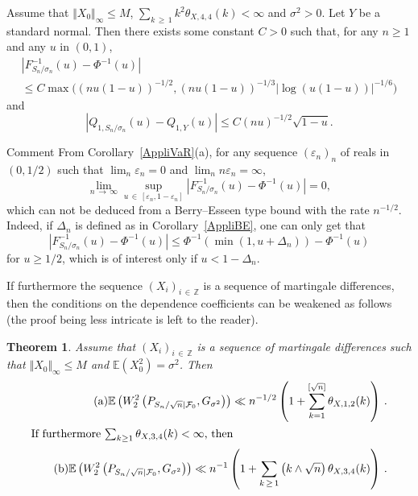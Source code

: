 \documentclass[10pt]{amsart}
\newtheorem{theo}{Theorem}[section]
\theoremstyle{definition}\newtheorem{defi}[theo]{Definition}\newtheorem{rema}[theo]{Remark}\newtheorem{exam}[theo]{Example}\newtheorem{exem}[theo]{Example}\newtheorem{nota}[theo]{Notation}
\newcommand{\bbE}{\mathbb{E}}
\newcommand{\bbZ}{\mathbb{Z}}
\newcommand{\clF}{\mathcal{F}}
\begin{document}
\begin{coro}\label{AppliVaR}
Assume that $\Vert X_0 \Vert_{\infty} \leq M$, $\sum_{k\,\geq\,1} k^2
\theta_{X,4,4} (k) < \infty$ and $\sigma^2 >0$. Let $Y$ be a standard normal. Then there exists some constant $C>0$ such that, for any $n\geq 1$ and any $u$ in $(0,1)$,
\begin{multline}\label{coro2.5.a}
\tag{$\rm a$} \left| F_{S_n/\sigma_n}^{-1} (u) - \Phi^{-1} (u) \right| \\ \leq C \max \bigl((nu(1-u))^{-1/2}, (nu(1-u))^{-1/3} |\log (u(1-u)) |^{-1/6} \bigr)
\end{multline}
and
\begin{equation}\label{coro2.5.b}
\tag{$\rm b$}\left| Q_{1, S_n/\sigma_n} (u) - Q_{1,Y} (u)\right| \leq C (nu)^{-1/2} \sqrt{1-u}.
\end{equation}
\end{coro}

\begin{enonce}{Comment}
From Corollary~\ref{AppliVaR}(a), for any sequence $(\varepsilon_n)_n$ of reals in $(0,1/2)$
such that $\lim_n \varepsilon_n= 0$ and $\lim_n n\varepsilon_n = \infty$,
\[
\lim_{n\,\rightarrow\,\infty}
\sup_{u\,\in\,\left[\varepsilon_n,1-\varepsilon_n\right]} \left| F_{S_n/\sigma_n}^{-1} (u) - \Phi^{-1} (u) \right| = 0,
\]
which can not be deduced from a Berry--Esseen type bound with the rate $n^{-1/2}$. Indeed,
if $\Delta_n$ is defined as in Corollary~\ref{AppliBE}, one can only get that
\[
\left| F_{S_n/\sigma_n}^{-1} (u) - \Phi^{-1} (u)\right| \leq \Phi^{-1} (\min (1, u + \Delta_n)) - \Phi^{-1} (u)
\]
for $u\geq 1/2$, which is of interest only if $u < 1 - \Delta_n$.
\end{enonce}

If furthermore the sequence $(X_i)_{i \,\in\,\bbZ}$ is a sequence of martingale differences, then the conditions on the dependence coefficients can be weakened as follows (the proof being less intricate is left to the reader).

\begin{theo} \label{thW2M}
Assume that $(X_i)_{i\,\in\,\bbZ}$ is a sequence of martingale differences such that $\Vert X_0 \Vert_{\infty} \leq M$ and $\bbE (X_0^2) = \sigma^2$. Then
\begin{align}
\tag{$\rm a$}\bbE \left(W_2^2 \left(P_{S_n / {\sqrt n} |\clF_0 }, G_{\sigma^2}\right) \right) \ll n^{-1/2}
\left(1 + \sum_{k=1}^ {[\sqrt n]} \theta_{X,1,2} (k) \right) \,. \label{theo2.7.a}
\\
\intertext{If furthermore $ \sum_{k\geq 1} \theta_{X,3,4} (k) < \infty$, then}
\tag{$\rm b$}\bbE \left(W_2^2 \left(P_{S_n / {\sqrt n} |\clF_0 }, G_{\sigma^2}\right) \right) \ll n^{-1} \left(1 + \sum_{k\,\geq\,1} \left(k \wedge \sqrt{n}\right) \theta_{X,3,4} (k) \right)\,. \label{theo2.7.b}
\end{align}
\end{theo}
\end{document}
